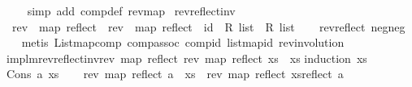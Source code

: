 \begin{isabellebody}
%
\isadelimproof
\ \ \ %
\endisadelimproof
%
\isatagproof
{}\isamarkupfalse%
\ {\isacharparenleft}{\kern0pt}simp\ add{\isacharcolon}{\kern0pt}\ comp{\isacharunderscore}{\kern0pt}def\ rev{\isacharunderscore}{\kern0pt}map{\isacharparenright}{\kern0pt}%
\endisatagproof
{\isafoldproof}%
%
\isadelimproof
\isanewline
%
\endisadelimproof
\isanewline
{}\isamarkupfalse%
\ rev{\isacharunderscore}{\kern0pt}reflect{\isacharunderscore}{\kern0pt}inv{\isacharcolon}{\kern0pt}\isanewline
\ \ {\isachardoublequoteopen}{\isacharparenleft}{\kern0pt}rev\ {\isasymcirc}\ {\isacharparenleft}{\kern0pt}map\ reflect{\isacharparenright}{\kern0pt}{\isacharparenright}{\kern0pt}\ {\isasymcirc}\ {\isacharparenleft}{\kern0pt}rev\ {\isasymcirc}\ {\isacharparenleft}{\kern0pt}map\ reflect{\isacharparenright}{\kern0pt}{\isacharparenright}{\kern0pt}\ {\isacharequal}{\kern0pt}\ {\isacharparenleft}{\kern0pt}id\ {\isacharcolon}{\kern0pt}{\isacharcolon}{\kern0pt}\ R{}\ list\ {\isasymRightarrow}\ R{}\ list{\isacharparenright}{\kern0pt}{\isachardoublequoteclose}\isanewline
%
\isadelimproof
\ \ %
\endisadelimproof
%
\isatagproof
{}\isamarkupfalse%
\ rev{\isacharunderscore}{\kern0pt}reflect\ neg{\isacharunderscore}{\kern0pt}neg\isanewline
\ \ \isamarkupfalse%
\ {\isacharparenleft}{\kern0pt}metis\ List{\isachardot}{\kern0pt}map{\isachardot}{\kern0pt}comp\ comp{\isacharunderscore}{\kern0pt}assoc\ comp{\isacharunderscore}{\kern0pt}id\ list{\isachardot}{\kern0pt}map{\isacharunderscore}{\kern0pt}id{}\ rev{\isacharunderscore}{\kern0pt}involution{\isacharparenright}{\kern0pt}%
\endisatagproof
{\isafoldproof}%
%
\isadelimproof
\isanewline
%
\endisadelimproof
\isanewline
{}\isamarkupfalse%
\ implm{\isacharunderscore}{\kern0pt}rev{\isacharunderscore}{\kern0pt}reflect{\isacharunderscore}{\kern0pt}inv{\isacharcolon}{\kern0pt}{\isachardoublequoteopen}rev\ {\isacharparenleft}{\kern0pt}map\ reflect\ {\isacharparenleft}{\kern0pt}rev\ {\isacharparenleft}{\kern0pt}map\ reflect\ xs{\isacharparenright}{\kern0pt}{\isacharparenright}{\kern0pt}{\isacharparenright}{\kern0pt}\ {\isacharequal}{\kern0pt}\ xs{\isachardoublequoteclose}\isanewline
%
\isadelimproof
%
\endisadelimproof
%
\isatagproof
{}\isamarkupfalse%
{\isacharparenleft}{\kern0pt}induction\ xs{\isacharparenright}{\kern0pt}\isanewline
\ \ \isamarkupfalse%
\ {\isacharparenleft}{\kern0pt}Cons\ a\ xs{\isacharparenright}{\kern0pt}\isanewline
\ \ \isamarkupfalse%
\ {\isachardoublequoteopen}rev\ {\isacharparenleft}{\kern0pt}map\ reflect\ {\isacharparenleft}{\kern0pt}a\ {\isacharhash}{\kern0pt}\ xs{\isacharparenright}{\kern0pt}{\isacharparenright}{\kern0pt}\ {\isacharequal}{\kern0pt}\ {\isacharparenleft}{\kern0pt}rev\ {\isacharparenleft}{\kern0pt}map\ reflect\ xs{\isacharparenright}{\kern0pt}{\isacharparenright}{\kern0pt}{\isacharat}{\kern0pt}{\isacharbrackleft}{\kern0pt}reflect\ a{\isacharbrackright}{\kern0pt}{\isachardoublequoteclose}\isanewline

\end{isabellebody}
